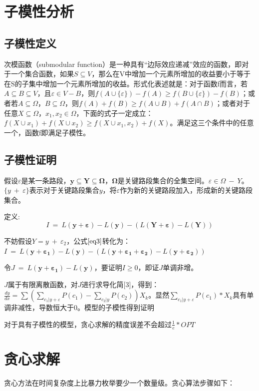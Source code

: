 		\section{子模性分析}
			\subsection{子模性定义}
			次模函数（submodular function）是一种具有“边际效应递减”效应的函数，即对于一个集合函数，如果$S \subseteq V$，那么在V中增加一个元素所增加的收益要小于等于在S的子集中增加一个元素所增加的收益。形式化表述就是：对于函数f而言，若$A \subseteq B \subseteq V$，且$\varepsilon  \in V - B$，则$f(A \cup \{ \varepsilon \} ) - f(A) \ge f(B \cup \{ \varepsilon \} ) - f(B)$；或者若$A \subseteq \Omega，B \subseteq \Omega$，则$f(A) + f(B) \ge f(A\mathop  \cup \nolimits B) + f(A\mathop  \cap \nolimits B)$；或者对于任意$X \subseteq \Omega，x_1,x_2 \in \Omega$，下面的式子一定成立：$f(X \cup {x_1}) + f(X \cup {x_2}) \ge f(X \cup {x_1},{x_2}) + f(X)$。满足这三个条件中的任意一个，函数f即满足子模性。

			\subsection{子模性证明}
				假设$\varepsilon$是某一条路段，$\bm{y} \subseteq \bm{Y} \subseteq \bm{\Omega}$，$\bm{\Omega}$是关键路段集合的全集空间。$\varepsilon \in \Omega \ - \ Y$。$\{y \ + \ \varepsilon\}$表示对于关键路段集合$y$，将$\varepsilon$作为新的关键路段加入，形成新的关键路段集合。

				定义:
				\begin{equation}
				I\ =\ L(\bm{y+\varepsilon})-L(\bm{y})-(L(\bm{Y+ \varepsilon}) - L(\bm{Y}))
				\label{eq3}
				\end{equation}

				不妨假设$Y = y\ +\ \varepsilon_2$，公式$\ref{eq3}$转化为：$I\ =\ L(\bm{y+\varepsilon_1})-L(\bm{y})-(L(\bm{y+ \varepsilon_1+\varepsilon_2}) - L(\bm{y+\varepsilon_2}))$

				令$J\ =\ L(\bm{y+\varepsilon_1})-L(\bm{y})$，要证明$I \ge 0$，即证$J$单调非增。

				$J$属于有限离散函数，对$J$进行求导化简[3]，得到：$\frac{{dy}}{{dx}} = \sum {(\sum\limits_{{c_1}|y + \varepsilon } {P({c_1})}  - \sum\limits_{{c_2}|y} {P({c_2})} )} {X_k}$。显然${\sum\limits_{{c_1}|y + \varepsilon } {P({c_1})} * X_k}$具有单调非减性，导数恒大于0。模型的子模性得到证明

				对于具有子模性的模型，贪心求解的精度误差不会超过$\frac{1}{e} * OPT$
		\section{贪心求解}
			贪心方法在时间复杂度上比暴力枚举要少一个数量级。贪心算法步骤如下：
 
